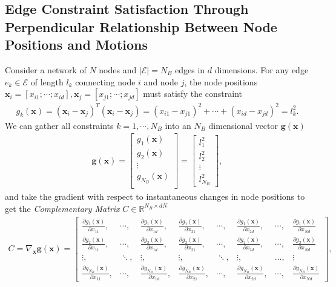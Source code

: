 \documentclass[%
preprint,
 amsmath,amssymb,
 aps,
]{revtex4-1}
\newcommand{\mc}{\mathcal}
\newcommand{\real}{\mathbb{R}}
\begin{document}
\subsection{Edge Constraint Satisfaction Through Perpendicular Relationship Between Node Positions and Motions}
Consider a network of $N$ nodes and $| \mc E | = N_B$ edges in $d$ dimensions. For any edge $e_k \in \mc E$ of length $l_k$ connecting node $i$ and node $j$, the node positions $\bm{x}_i = [x_{i1}; \dotsm; x_{id}], \bm{x}_j = [x_{j1}; \dotsm; x_{jd}]$ must satisfy the constraint 
\begin{align*}
g_k(\bm{x}) = (\bm{x}_i - \bm{x}_j)^T (\bm{x}_i - \bm{x}_j) = (x_{i1}-x_{j1})^2 + \dotsm + (x_{id}-x_{jd})^2 = l_k^2.
\end{align*}
We can gather all constraints $k = 1, \dotsm, N_B$ into an $N_B$ dimensional vector $\bm{g}(\bm{x})$
\begin{align*}
\bm{g}(\bm{x}) = 
\begin{bmatrix}
g_1(\bm{x})\\
g_2(\bm{x})\\
\vdots\\
g_{N_B}(\bm{x})\\
\end{bmatrix}
=
\begin{bmatrix}
l_1^2\\
l_2^2\\
\vdots\\
l_{N_B}^2
\end{bmatrix},
\end{align*}
and take the gradient with respect to instantaneous changes in node positions to get the \emph{Complementary Matrix} $C \in \real^{N_B \times dN}$
\begin{align*}
C = \nabla_{\bm{x}} \bm{g}(\bm{x}) =
\begin{bmatrix}
\frac{\partial g_1(\bm{x})}{\partial x_{11}}, & \dotsm, & \frac{\partial g_1(\bm{x})}{\partial x_{1d}}, & \frac{\partial g_1(\bm{x})}{\partial x_{21}}, & \dotsm, & \frac{\partial g_1(\bm{x})}{\partial x_{2d}}, & \dotsm, & \frac{\partial g_1(\bm{x})}{\partial x_{Nd}}\\
\frac{\partial g_2(\bm{x})}{\partial x_{11}}, & \dotsm, & \frac{\partial g_2(\bm{x})}{\partial x_{1d}}, & \frac{\partial g_2(\bm{x})}{\partial x_{21}}, & \dotsm, & \frac{\partial g_2(\bm{x})}{\partial x_{2d}}, & \dotsm, & \frac{\partial g_2(\bm{x})}{\partial x_{Nd}}\\
\vdots, & \ddots, & \vdots, & \vdots, & \ddots, & \vdots, & \dots, & \vdots\\
\frac{\partial g_{N_B}(\bm{x})}{\partial x_{11}}, & \dotsm, & \frac{\partial g_{N_B}(\bm{x})}{\partial x_{1d}}, & \frac{\partial g_{N_B}(\bm{x})}{\partial x_{21}}, & \dotsm, & \frac{\partial g_{N_B}(\bm{x})}{\partial x_{2d}}, & \dotsm, & \frac{\partial g_{N_B}(\bm{x})}{\partial x_{Nd}}
\end{bmatrix},
\end{align*}
\end{document}
